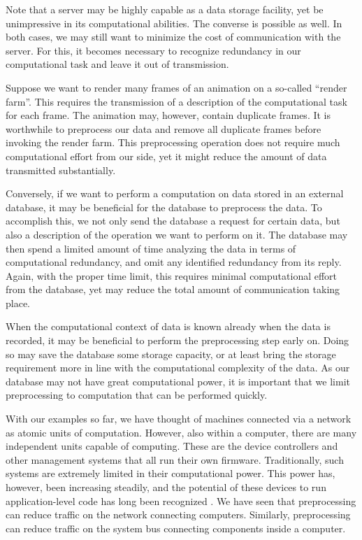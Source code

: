 Note that a server may be highly capable as a data storage facility, yet be unimpressive in its computational abilities.
The converse is possible as well.
In both cases, we may still want to minimize the cost of communication with the server.
For this, it becomes necessary to recognize redundancy in our computational task and leave it out of transmission.
\begin{example}
  Suppose we want to render many frames of an animation on a so-called \enquote{render farm}.
  This requires the transmission of a description of the computational task for each frame.
  The animation may, however, contain duplicate frames.
  It is worthwhile to preprocess our data and remove all duplicate frames before invoking the render farm.
  This preprocessing operation does not require much computational effort from our side, yet it might reduce the amount of data transmitted substantially.

  Conversely, if we want to perform a computation on data stored in an external database, it may be beneficial for the database to preprocess the data.
  To accomplish this, we not only send the database a request for certain data, but also a description of the operation we want to perform on it.
  The database may then spend a limited amount of time analyzing the data in terms of computational redundancy, and omit any identified redundancy from its reply.
  Again, with the proper time limit, this requires minimal computational effort from the database, yet may reduce the total amount of communication taking place.
\end{example}

When the computational context of data is known already when the data is recorded, it may be beneficial to perform the preprocessing step early on.
Doing so may save the database some storage capacity, or at least bring the storage requirement more in line with the computational complexity of the data.
As our database may not have great computational power, it is important that we limit preprocessing to computation that can be performed quickly.

With our examples so far, we have thought of machines connected via a network as atomic units of computation.
However, also within a computer, there are many independent units capable of computing.
These are the device controllers and other management systems that all run their own firmware.
Traditionally, such systems are extremely limited in their computational power.
This power has, however, been increasing steadily, and the potential of these devices to run application-level code has long been recognized \parencite[for example][]{riedel1998active}.
We have seen that preprocessing can reduce traffic on the network connecting computers.
Similarly, preprocessing can reduce traffic on the system bus connecting components inside a computer.

